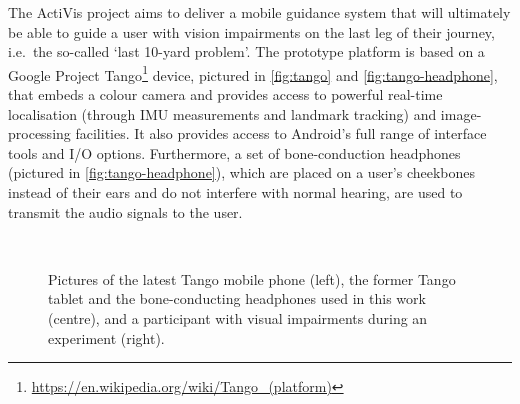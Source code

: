 \documentclass{llncs}
\begin{document}
The ActiVis project aims to deliver a mobile guidance system that will ultimately be able to guide a user with vision impairments on the last leg of their journey, i.e.\ the so-called `last 10-yard problem'. 
The prototype platform is based on a Google Project Tango\footnote{\url{https://en.wikipedia.org/wiki/Tango\_(platform)}} device, pictured in \cref{fig:tango} and \cref{fig:tango-headphone}, that embeds a colour camera and provides access to powerful real-time localisation (through IMU measurements and landmark tracking) and image-processing facilities. 
It also provides access to Android's full range of interface tools and I/O options. 
Furthermore, a set of bone-conduction headphones (pictured in \cref{fig:tango-headphone}), which are placed on a user's cheekbones instead of their ears and do not interfere with normal hearing, are used to transmit the audio signals to the user.

\begin{figure}[t]
  \centering
~
~
  \caption{Pictures of the latest Tango mobile phone (left), the former Tango tablet and the bone-conducting headphones used in this work (centre), and a participant with visual impairments during an experiment (right).}
\end{figure}
\end{document}
